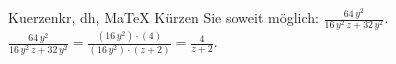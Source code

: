 \begin{MAufgabe}{Kuerzen}{kr, dh, MaTeX}
K\"urzen Sie soweit m\"oglich: $\frac{64\, y^2}{16\, y^2\, z + 32\, y^2}$.\\ 
\ifLsg\MLoesung
\quad $\frac{64\, y^2}{16\, y^2\, z + 32\, y^2}=\frac{(16\, y^2)\cdot(4)}{(16\, y^2)\cdot(z + 2)}=\frac{4}{z + 2}$.\else\relax\fi
 \end{MAufgabe}